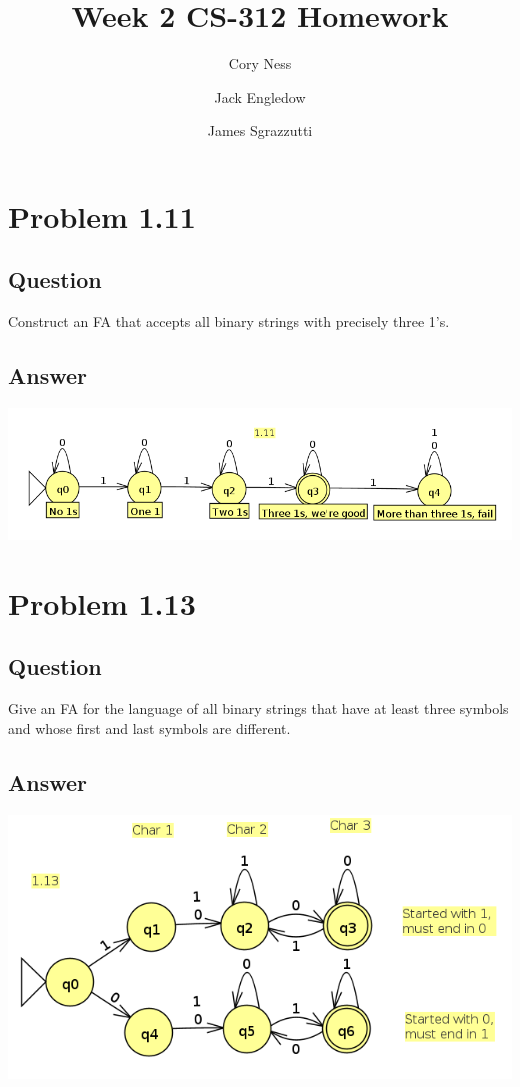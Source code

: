 \documentclass[12pt, a4paper]{article}
\title{Week 2 CS-312 Homework}
\author{
	Cory Ness
	\and
	Jack Engledow
	\and
	James Sgrazzutti
}
\begin{document}
\maketitle

\section{Problem 1.11}
\subsection{Question}
Construct an FA that accepts all binary strings with precisely three 1's.
\subsection{Answer}
\begin{center}
\includegraphics[scale=0.3]{1.11}
\end{center}

\section{Problem 1.13}
\subsection{Question}
Give an FA for the language of all binary strings that have at least three symbols and whose first and last symbols are different.
\subsection{Answer}
\begin{center}
\includegraphics[scale=0.3]{1.13}
\end{center}
\end{document}
